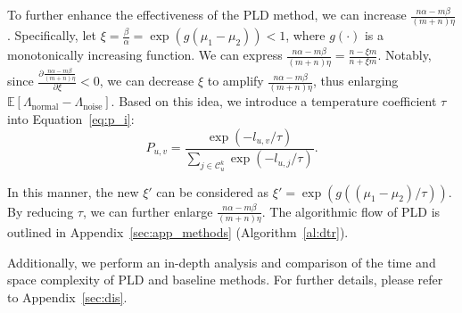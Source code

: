 To further enhance the effectiveness of the PLD method, we can increase \(\frac{n\alpha - m\beta}{(m+n)\eta}\). Specifically, let \(\xi = \frac{\beta}{\alpha} = \exp\left(g\left(\mu_1 - \mu_2\right)\right) < 1\), where $g(\cdot)$ is a monotonically increasing function. We can express \(\frac{n\alpha - m\beta}{(m+n)\eta} = \frac{n - \xi m}{n + \xi m}\). Notably, since \(\frac{\partial \frac{n\alpha - m\beta}{(m+n)\eta}}{\partial \xi} < 0\), we can decrease \(\xi\) to amplify \(\frac{n\alpha - m\beta}{(m+n)\eta}\), thus enlarging \(\mathbb{E}[\Lambda_{\text{normal}} - \Lambda_{\text{noise}}]\).
Based on this idea, we introduce a temperature coefficient \(\tau\) into Equation~\ref{eq:p_i}:
\begin{equation}
\label{eq:p_tau}
    P_{u, v} = \frac{\exp(-l_{u,v} / \tau)}{\sum_{j \in \mathcal{C}_{u}^{k}} \exp(-l_{u,j} / \tau)}.
\end{equation}

In this manner, the new \(\xi'\) can be considered as \(\xi' = \exp\left(g\left(\left(\mu_1 - \mu_2\right)/\tau\right)\right)\). By reducing \(\tau\), we can further enlarge \(\frac{n\alpha - m\beta}{(m+n)\eta}\). The algorithmic flow of PLD is outlined in Appendix~\ref{sec:app_methods} (Algorithm~\ref{al:dtr}).

Additionally, we perform an in-depth analysis and comparison of the time and space complexity of PLD and baseline methods. For further details, please refer to Appendix~\ref{sec:dis}.
